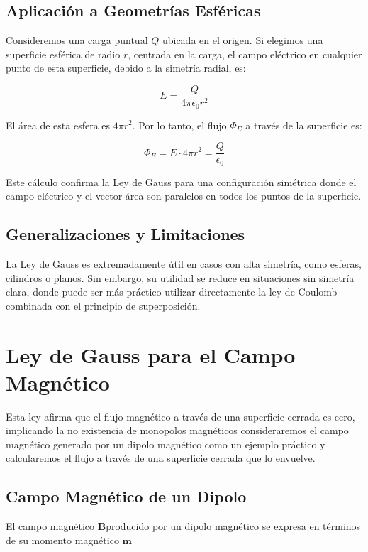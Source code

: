 \documentclass{article}
\begin{document}
\subsection{Aplicación a Geometrías Esféricas}

Consideremos una carga puntual $Q$ ubicada en el origen. Si elegimos una superficie esférica de radio $r$, centrada en la carga, el campo eléctrico en cualquier punto de esta superficie, debido a la simetría radial, es:

\begin{equation}
	E = \frac{Q}{4\pi \epsilon_0 r^2}
\end{equation}

El área de esta esfera es $4\pi r^2$. Por lo tanto, el flujo $\Phi_E$ a través de la superficie es:

\begin{equation}
	\Phi_E = E \cdot 4\pi r^2 = \frac{Q}{\epsilon_0}
\end{equation}

Este cálculo confirma la Ley de Gauss para una configuración simétrica donde el campo eléctrico y el vector área son paralelos en todos los puntos de la superficie.

\subsection{Generalizaciones y Limitaciones}

La Ley de Gauss es extremadamente útil en casos con alta simetría, como esferas, cilindros o planos. Sin embargo, su utilidad se reduce en situaciones sin simetría clara, donde puede ser más práctico utilizar directamente la ley de Coulomb combinada con el principio de superposición.

\section{Ley de Gauss para el Campo Magnético}
Esta ley afirma que el flujo magnético a través de una superficie cerrada es cero, implicando la no existencia de monopolos magnéticos
consideraremos el campo magnético generado por un dipolo magnético como un ejemplo práctico y calcularemos el flujo a través de una superficie cerrada que lo envuelve.

\subsection{Campo Magnético de un Dipolo}
El campo magnético \(\mathbf{B}\)producido por un dipolo magnético se expresa en términos de su momento magnético \(\mathbf{m}\)
\end{document}
